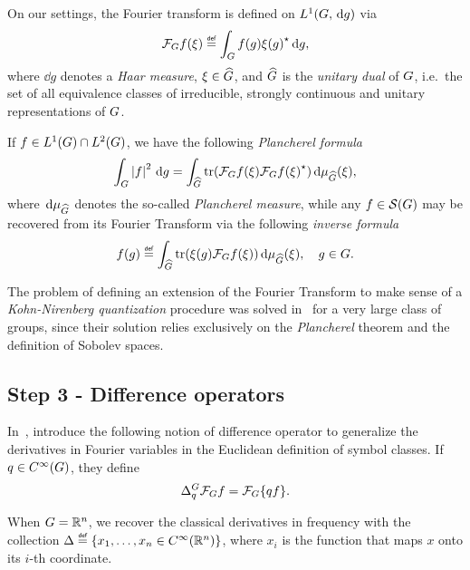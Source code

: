 On our settings,
the Fourier transform is defined on $\Lebesgue 1 {\Group, \dd g}$ via
\begin{align*}
    \Fourier f(\xi)
    \defeq \int_\Group f(g) \adj{\xi(g)} \dd g,
\end{align*}
where $\dd g$ denotes a \emph{Haar measure},
$\xi \in \dualGroup \Group$,
and $\dualGroup \Group$ is the \emph{unitary dual} of $\Group$,
i.e.\ the set of all equivalence classes of irreducible, strongly continuous and unitary representations of $\Group$.

If $f \in \Lebesgue 1 \Group \cap \Lebesgue 2 \Group$,
we have the following \emph{Plancherel formula}
\begin{align*}
    \int_\Group \abs f^2 \dd g
    = \int_{\dualGroup \Group}
    \tr(\Fourier f(\xi) \adj{\Fourier f(\xi)})
    \dd \mu_{\dualGroup \Group}(\xi),
\end{align*}
where $\dd \mu_{\dualGroup \Group}$ denotes the so-called \emph{Plancherel measure},
while any $f \in \Schwartz \Group$ may be recovered from its Fourier Transform via
the following \emph{inverse formula}
\begin{align*}
    f(g) \defeq
    \int_{\dualGroup \Group}
    \tr(\xi(g) \Fourier f(\xi))
    \dd \mu_{\dualGroup \Group}(\xi),
    \quad g \in \Group.
\end{align*}

The problem of defining an extension of the Fourier Transform to make sense of a \emph{Kohn-Nirenberg quantization} procedure was solved in~\cite[Subsection 5.1.1]{FischerRuzhansky16} for a very large class of groups,
since their solution relies exclusively on the \emph{Plancherel} theorem and the definition of Sobolev spaces.

\subsection*{Step 3 - Difference operators}

In~\cite{RuzhanskyTurunen10},
\citeauthor{RuzhanskyTurunen10} introduce the following notion of difference operator
to generalize the derivatives in Fourier variables in the Euclidean definition of symbol classes.
If $q \in \SmoothFunctions \Group$,
they define
\begin{align*}
    \DifferenceOperator [\Group] q \Fourier f = \Fourier \{q f\}.
\end{align*}

When $\Group = \R^n$,
we recover the classical derivatives in frequency with the collection
$\Delta \defeq \{x_1, \dots, x_n \in \SmoothFunctions {\R^n}\}$,
where $x_i$ is the function that maps $x$ onto its $i$-th coordinate.


